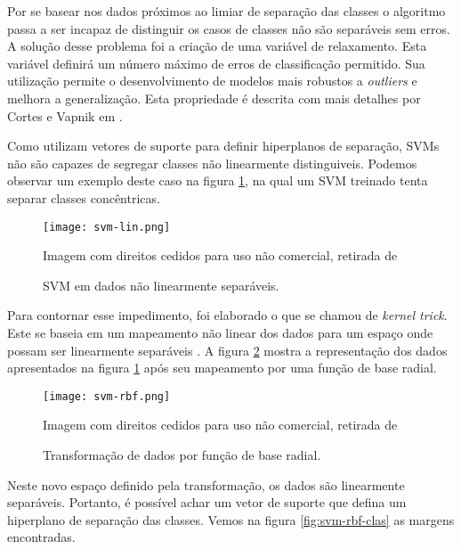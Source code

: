 Por se basear nos dados próximos ao limiar de separação das classes o algoritmo passa a ser incapaz de distinguir os casos de classes não são separáveis sem erros. A solução desse problema foi a criação de uma variável de relaxamento. Esta variável definirá um número máximo de erros de classificação permitido. Sua utilização permite o desenvolvimento de modelos mais robustos a \textit{outliers} e melhora a generalização. Esta propriedade é descrita com mais detalhes por Cortes e Vapnik em \cite{cortes95}.

Como utilizam vetores de suporte para definir hiperplanos de separação, SVMs não são capazes de segregar classes não linearmente distinguiveis. Podemos observar um exemplo deste caso na figura \ref{fig:svm-lin}, na qual um SVM treinado tenta separar classes concêntricas.

\begin{figure}
\begin{center} {
    \begin{center}
    \texttt{[image: svm-lin.png]}
    \caption{SVM em dados não linearmente separáveis.}
    \small Imagem com direitos cedidos para uso não comercial, retirada de \cite{vanderplas15}
    \label{fig:svm-lin}
    \end{center}
}
\end{center}
\end{figure}

Para contornar esse impedimento, foi elaborado o que se chamou de \textit{kernel trick}. Este se baseia em um mapeamento não linear dos dados para um espaço onde possam ser linearmente separáveis \cite{scholkopf02}. A figura \ref{fig:svm-rbf} mostra a representação dos dados apresentados na figura \ref{fig:svm-lin} após seu mapeamento por uma função de base radial.

\begin{figure}
\begin{center} {
    \begin{center}
    \texttt{[image: svm-rbf.png]}
    \caption{Transformação de dados por função de base radial.}
    \small Imagem com direitos cedidos para uso não comercial, retirada de \cite{vanderplas15}
    \label{fig:svm-rbf}
    \end{center}
}
\end{center}
\end{figure}

Neste novo espaço definido pela transformação, os dados são linearmente separáveis. Portanto, é possível achar um vetor de suporte que defina um hiperplano de separação das classes. Vemos na figura \ref{fig:svm-rbf-clas} as margens encontradas.


